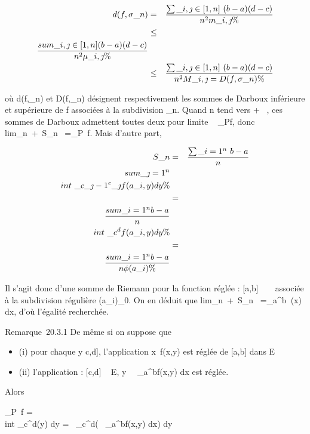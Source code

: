 \documentclass[]{article}
\begin{document}
\begin{align*} d(f,\sigma\_n)& =&
\sum \_i,\jmath\in{[}1,n{]}~ (b - a)(d - c)
\over n^2 m\_i,\jmath \%&
\\ & \leq& \\sum
\_i,\jmath\in{[}1,n{]} (b - a)(d - c) \over
n^2 \mu\_i,\jmath \%& \\ &
\leq& \sum \_i,\jmath\in{[}1,n{]}~ (b - a)(d - c)
\over n^2 M\_i,\jmath =
D(f,\sigma\_n)\%& \\
\end{align*}

où d(f,\sigma\_n) et D(f,\sigma\_n) désignent respectivement les
sommes de Darboux inférieure et supérieure de f associées à la
subdivision \sigma\_n. Quand n tend vers + \infty~, ces sommes de Darboux
admettent toutes deux pour limite \int ~
\_Pf, donc lim\_n\rightarrow~+\infty~S\_n~
=\int  \_P~f. Mais d'autre part,

\begin{align*} S\_n& =&
\sum \_i=1^n~ b - a
\over n \\sum
\_\jmath=1^n
\\int  ~
\_c\_\jmath-1^c\_\jmath f(a\_i,y) dy\%&
\\ & =& \\sum
\_i=1^n b - a \over n
\\int  ~
\_c^df(a\_ i,y) dy \%&
\\ & =& \\sum
\_i=1^n b - a \over n \phi(a\_i)
\%& \\ \end{align*}

Il s'agit donc d'une somme de Riemann pour la fonction réglée \phi :
{[}a,b{]} \rightarrow~ ~ associée à la subdivision régulière
(a\_i)\_0\leqi\leqn. On en déduit que
lim\_n\rightarrow~+\infty~S\_n~
=\int  \_a^b~\phi(x) dx, d'où
l'égalité recherchée.

Remarque~20.3.1 De même si on suppose que

\begin{itemize}
\itemsep1pt\parskip0pt
\item
  (i) pour chaque y \in {[}c,d{]}, l'application
  x\mapsto~f(x,y) est réglée de {[}a,b{]} dans E
\item
  (ii) l'application \psi : {[}c,d{]} \rightarrow~ E,
  y\mapsto~\int ~
  \_a^bf(x,y) dx est réglée.
\end{itemize}

Alors

\int  \_P~f =\\int
 \_c^d\psi(y) dy =\int ~
\_c^d\left (\int ~
\_a^bf(x,y) dx\right ) dy
\end{document}
